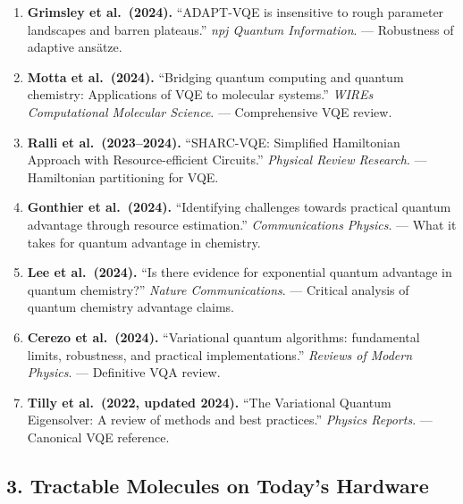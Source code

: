 \documentclass[
  11pt,
]{report}
\begin{document}
\begin{enumerate}
\def\labelenumi{\arabic{enumi}.}
\item
  \textbf{Grimsley et al.~(2024).} ``ADAPT-VQE is insensitive to rough
  parameter landscapes and barren plateaus.'' \emph{npj Quantum
  Information}. --- Robustness of adaptive ansätze.
\item
  \textbf{Motta et al.~(2024).} ``Bridging quantum computing and quantum
  chemistry: Applications of VQE to molecular systems.'' \emph{WIREs
  Computational Molecular Science}. --- Comprehensive VQE review.
\item
  \textbf{Ralli et al.~(2023--2024).} ``SHARC-VQE: Simplified
  Hamiltonian Approach with Resource-efficient Circuits.''
  \emph{Physical Review Research}. --- Hamiltonian partitioning for VQE.
\item
  \textbf{Gonthier et al.~(2024).} ``Identifying challenges towards
  practical quantum advantage through resource estimation.''
  \emph{Communications Physics}. --- What it takes for quantum advantage
  in chemistry.
\item
  \textbf{Lee et al.~(2024).} ``Is there evidence for exponential
  quantum advantage in quantum chemistry?'' \emph{Nature
  Communications}. --- Critical analysis of quantum chemistry advantage
  claims.
\item
  \textbf{Cerezo et al.~(2024).} ``Variational quantum algorithms:
  fundamental limits, robustness, and practical implementations.''
  \emph{Reviews of Modern Physics}. --- Definitive VQA review.
\item
  \textbf{Tilly et al.~(2022, updated 2024).} ``The Variational Quantum
  Eigensolver: A review of methods and best practices.'' \emph{Physics
  Reports}. --- Canonical VQE reference.
\end{enumerate}

\subsection{3. Tractable Molecules on Today's
Hardware}\label{tractable-molecules-on-todays-hardware}
\end{document}
